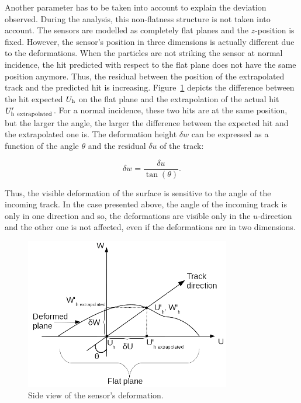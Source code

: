       Another parameter has to be taken into account to explain the deviation observed.
      During the analysis, this non-flatness structure is not taken into account.
      The sensors are modelled as completely flat planes and the $z$-position is fixed.
      However, the sensor's position in three dimensions is actually different due to the deformations.
      When the particles are not striking the sensor at normal incidence, the hit predicted with respect to the flat plane does not have the same position anymore.
      Thus, the residual between the position of the extrapolated track and the predicted hit is increasing.
      Figure~\ref{fig:originDef} depicts the difference between the hit expected $U_{\rm{h}}$ on the flat plane and the extrapolation of the actual hit $U'_{\rm{h~extrapolated}}$.
      For a normal incidence, these two hits are at the same position, but the larger the angle, the larger the difference between the expected hit and the extrapolated one is.
      The deformation height $\delta w$ can be expressed as a function of the angle $\theta$ and the residual $\delta u$ of the track:

      \begin{equation}
        \delta w = \frac{\delta u}{\tan(\theta)}.
        \label{eq:deltaW}
      \end{equation}

      Thus, the visible deformation of the surface is sensitive to the angle of the incoming track.
      In the case presented above, the angle of the incoming track is only in one direction and so, the deformations are visible only in the $u$-direction and the other one is not affected, even if the deformations are in two dimensions.

      \begin{figure}[!h]
      \centering
        \includegraphics[width = 0.8\textwidth]{Pictures/deformation/origin_deformation.png}
        \caption{Side view of the sensor's deformation.}
        \label{fig:originDef}
      \end{figure}

